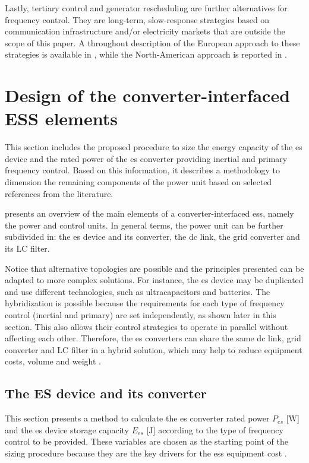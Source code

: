 \documentclass[utf8]{frontiersSCNS} %
\begin{document}
Lastly, tertiary control and generator rescheduling are further alternatives for frequency control. They are long-term, slow-response strategies based on communication infrastructure and/or electricity markets that are outside the scope of this paper. A throughout description of the European approach to these strategies is available in \cite{comissionregulationeuGuidelineCapacityAllocation2017}, while the North-American approach is reported in \cite{etoFrequencyControlRequirements2018}.

\section{Design of the converter-interfaced ESS elements}\label{sec:design}
This section includes the proposed procedure to size the energy capacity of the \gls{es} device and the rated power of the \gls{es} converter providing inertial and primary frequency control. Based on this information, it describes a methodology to dimension the remaining components of the power unit based on selected references from the literature. 

 presents an overview of the main elements of a converter-interfaced \gls{ess}, namely the power and control units. In general terms, the power unit can be further subdivided in: the \gls{es} device and its converter, the dc link, the grid converter and its LC filter.

Notice that alternative topologies are possible and the principles presented can be adapted to more complex solutions. For instance, the \gls{es} device may be duplicated and use different technologies, such as ultracapacitors and batteries. The hybridization is possible because the requirements for each type of frequency control (inertial and primary) are set independently, as shown later in this section. This also allows their control strategies to operate in parallel without affecting each other. Therefore, the \gls{es} converters can share the same dc link, grid converter and LC filter in a hybrid solution, which may help to reduce equipment costs, volume and weight \citep{rocabertControlEnergyStorage2019}.   

\subsection{The ES device and its converter}\label{sec:es-converter}
This section presents a method to calculate the \gls{es} converter rated power $P_{es}$ [$\si{\watt}$] and the \gls{es} device storage capacity $E_{es} $ [$\si{\joule}$] according to the type of frequency control to be provided. These variables are chosen as the starting point of the sizing procedure because they are the key drivers for the \gls{ess} equipment cost \citep{akhilDOEEPRIElectricity2015}.
\end{document}
